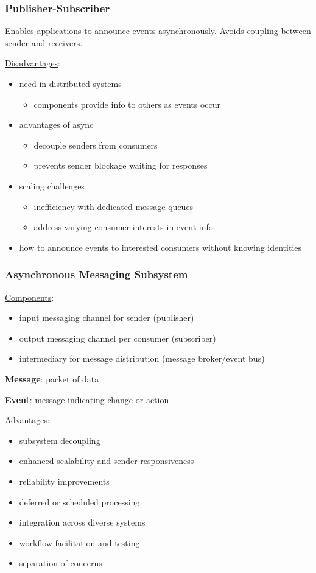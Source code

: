 \documentclass[11pt]{article}
\begin{document}
\subsubsection{Publisher-Subscriber}
\label{sec:org26ee220}
Enables applications to announce events asynchronously.
Avoids coupling between sender and receivers.

\uline{Disadvantages}:
\begin{itemize}
\item need in distributed systems
\begin{itemize}
\item components provide info to others as events occur
\end{itemize}
\item advantages of async
\begin{itemize}
\item decouple senders from consumers
\item prevents sender blockage waiting for responses
\end{itemize}
\item scaling challenges
\begin{itemize}
\item inefficiency with dedicated message queues
\item address varying consumer interests in event info
\end{itemize}
\item how to announce events to interested consumers
without knowing identities
\end{itemize}
\subsubsection{Asynchronous Messaging Subsystem}
\label{sec:org1e883a7}
\uline{Components}:
\begin{itemize}
\item input messaging channel for sender (publisher)
\item output messaging channel per consumer (subscriber)
\item intermediary for message distribution (message broker/event bus)
\end{itemize}

\textbf{Message}: packet of data

\textbf{Event}: message indicating change or action

\uline{Advantages}:
\begin{itemize}
\item subsystem decoupling
\item enhanced scalability and sender responsiveness
\item reliability improvements
\item deferred or scheduled processing
\item integration across diverse systems
\item workflow facilitation and testing
\item separation of concerns
\end{itemize}
\end{document}
